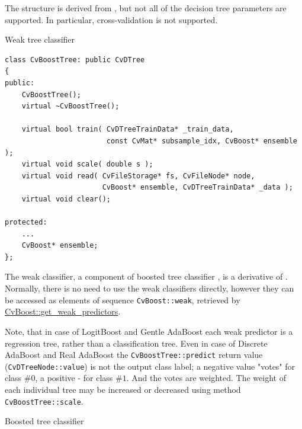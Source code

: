 The structure is derived from , but not all of the decision tree parameters are supported. In particular, cross-validation is not supported.



Weak tree classifier

\begin{lstlisting}
class CvBoostTree: public CvDTree
{
public:
    CvBoostTree();
    virtual ~CvBoostTree();

    virtual bool train( CvDTreeTrainData* _train_data,
                        const CvMat* subsample_idx, CvBoost* ensemble );
    virtual void scale( double s );
    virtual void read( CvFileStorage* fs, CvFileNode* node,
                       CvBoost* ensemble, CvDTreeTrainData* _data );
    virtual void clear();

protected:
    ...
    CvBoost* ensemble;
};
\end{lstlisting}


The weak classifier, a component of boosted tree classifier , is a derivative of . Normally, there is no need to use the weak classifiers directly, however they can be accessed as elements of sequence \texttt{CvBoost::weak}, retrieved by \href{#CvBoost.3A.3Agetweakpredictors}{CvBoost::get\_weak\_predictors}.

Note, that in case of LogitBoost and Gentle AdaBoost each weak predictor is a regression tree, rather than a classification tree. Even in case of Discrete AdaBoost and Real AdaBoost the \texttt{CvBoostTree::predict} return value (\texttt{CvDTreeNode::value}) is not the output class label; a negative value "votes" for class \#$0$, a positive - for class \#$1$. And the votes are weighted. The weight of each individual tree may be increased or decreased using method \texttt{CvBoostTree::scale}.



Boosted tree classifier

